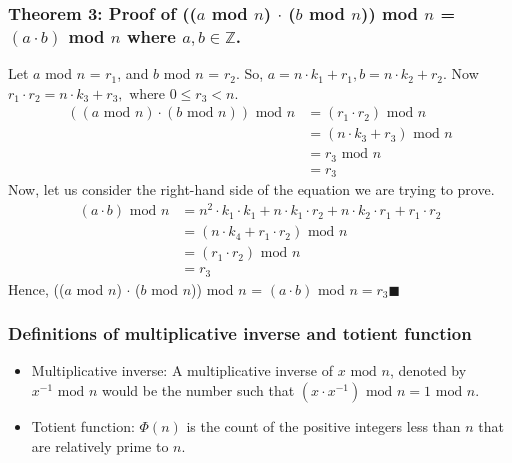 \documentclass[manuscript,screen,review,nonacm]{acmart}
\begin{document}
{\subsubsection* {Theorem 3: Proof of (($a$ mod $n$) $\cdot$ ($b$ mod $n$)) mod $n$ = $(a \cdot b)$ mod $n$ where $a,b\in \mathbb{Z}$.\newline}
Let $a$ mod $n$ = $r_1$, and $b$ mod $n$ = $r_2$. So, $a = n\cdot k_1 + r_1, b=n\cdot k_2+r_2$. \newline
Now $r_1 \cdot r_2 = n\cdot k_3 + r_3, \text{ where } 0 \leq r_3 < n$.
\begin{align*}
((a \text{ mod } n) \cdot (b \text{ mod } n)) \text{ mod } n &= (r_1\cdot r_2)\text{ mod } n \\
&= (n\cdot k_3 + r_3) \text{ mod } n \\
&= r_3 \text{ mod } n \\
&= r_3
\end{align*}
Now, let us consider the right-hand side of the equation we are trying to prove.
\begin{align*}
 (a\cdot b) \text{ mod } n &= n^2\cdot k_1\cdot k_1+ n\cdot k_1\cdot r_2 + n\cdot k_2\cdot r_1 + r_1\cdot r_2 \\
 &= (n\cdot k_4 + r_1\cdot r_2) \text{ mod } n \\
 &= (r_1 \cdot r_2) \text{ mod } n \\
 &= r_3
\end{align*}
Hence,  (($a$ mod $n$) $\cdot$ ($b$ mod $n$)) mod $n$ = $(a \cdot b)$ mod $n = r_3 \blacksquare $

\subsubsection*{Definitions of multiplicative inverse and totient function}

\begin{itemize}
    \item[] Multiplicative inverse: A multiplicative inverse of $x \text{ mod } n$, denoted by $x^{-1} \text{ mod } n$ would be the number such that $(x \cdot x^{-1})\text{ mod } n = 1 \text{ mod } n$.
    \item[] Totient function: $\Phi(n)$ is the count of the positive integers less than $n$ that are relatively prime to $n$.
    
\end{itemize}

}
\end{document}
